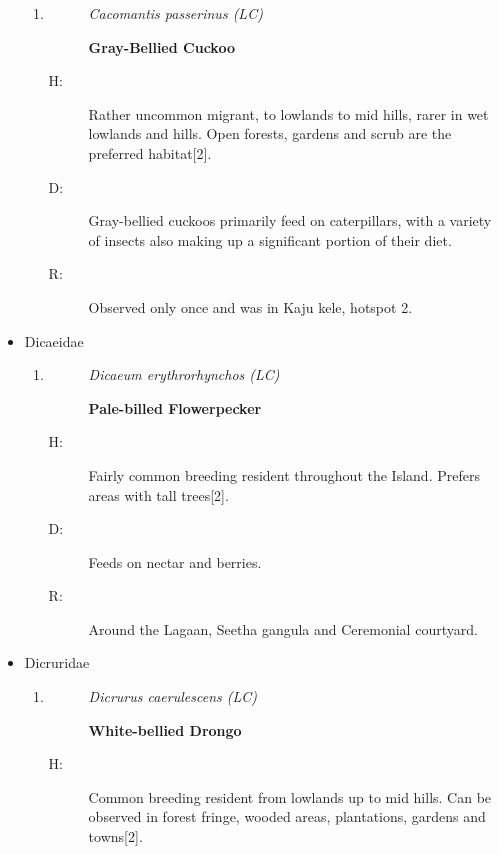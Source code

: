 \begin{itemize}
\begin{enumerate}
\item%
\begin{description}%
\item[]%
\textit{Cacomantis passerinus (LC)}%
\item[]%
\textbf{Gray{-}Bellied Cuckoo}%
\end{description}%
\begin{description}%
\item[H: ]%
Rather uncommon migrant, to lowlands to mid hills, rarer in wet lowlands and hills. Open forests, gardens and scrub are the preferred habitat{[}2{]}.%
\item[D: ]%
Gray{-}bellied cuckoos primarily feed on caterpillars, with a variety of insects also making up a significant portion of their diet.%
\item[R: ]%
Observed only once and was in Kaju kele, hotspot 2.%
\end{description}%
\end{enumerate}%
\item%
Dicaeidae%
\begin{enumerate}%
\item%
\begin{description}%
\item[]%
\textit{Dicaeum erythrorhynchos (LC)}%
\item[]%
\textbf{Pale{-}billed Flowerpecker}%
\end{description}%
\begin{description}%
\item[H: ]%
Fairly common breeding resident throughout the Island. Prefers areas with tall trees{[}2{]}.%
\item[D: ]%
Feeds on nectar and berries.%
\item[R: ]%
Around the Lagaan, Seetha gangula and Ceremonial courtyard.%
\end{description}%
\end{enumerate}%
\item%
Dicruridae%
\begin{enumerate}%
\item%
\begin{description}%
\item[]%
\textit{Dicrurus caerulescens (LC)}%
\item[]%
\textbf{White{-}bellied Drongo}%
\end{description}%
\begin{description}%
\item[H: ]%
Common breeding resident from lowlands up to mid hills. Can be observed in forest fringe, wooded areas, plantations, gardens and towns{[}2{]}.%

\end{description}
\end{enumerate}
\end{itemize}
